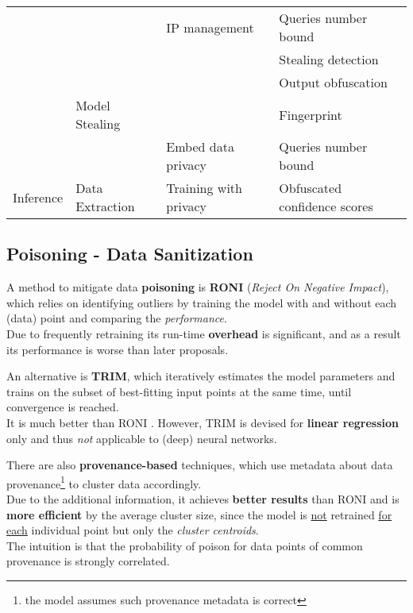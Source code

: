 \begin{table}[]
\begin{tabular}{@{}llll@{}}
   & & {IP management}            & {Queries number bound}         \\
   & & & {Stealing detection}           \\
   & & & {Output obfuscation}           \\
   & \multirow{-4}{*}{{Model Stealing}}   & & {Fingerprint}                  \\ \cmidrule(l){2-4} 
   & & {Embed data privacy}       & {Queries number bound}         \\
   \multirow{-9}{*}{{Inference}}                    & \multirow{-2}{*}{{Data Extraction}}  & {Training with privacy}    & {Obfuscated confidence scores} \\ \bottomrule
   \end{tabular}
   \end{table}

\subsection{Poisoning - Data Sanitization}
A method to mitigate data \textbf{poisoning} is \textbf{RONI} (\textit{Reject On Negative Impact}), which relies on identifying outliers by training the model with and without each (data) point and comparing the \textit{performance}.\\
Due to frequently retraining its run-time \textbf{overhead} is significant,
and as a result its performance is worse than later proposals.

An alternative is \textbf{TRIM},
which iteratively estimates the model parameters and trains on the
subset of best-fitting input points at the same time, until convergence is reached.\\
It is much better than RONI \smiley.
However, TRIM is devised for \textbf{linear regression} only and thus \textit{not} applicable to (deep) neural networks.

There are also \textbf{provenance-based} techniques, which use metadata about data provenance\footnote{the model assumes such provenance metadata is correct}
to cluster data accordingly.\\
Due to the additional information, it achieves \textbf{better results} than RONI and
is \textbf{more efficient} by the average cluster size, since the model is \underline{not}
retrained \underline{for each} individual point but only the \textit{cluster centroids}.\\
The intuition is that the probability of poison for data points of common
provenance is strongly correlated.

